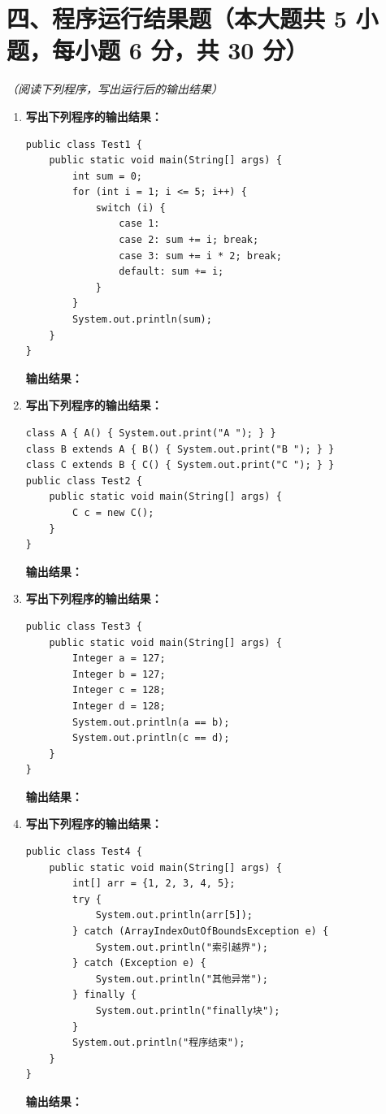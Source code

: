\documentclass[a3paper, landscape, 11pt, twocolumn]{article}
\begin{document}
\section*{四、程序运行结果题（本大题共 5 小题，每小题 6 分，共 30 分）}
\textit{（阅读下列程序，写出运行后的输出结果）}

\begin{enumerate}[label=\arabic*., itemsep=1em]
	\item \textbf{写出下列程序的输出结果：}
	      \begin{lstlisting}[style=JavaExam]
public class Test1 {
    public static void main(String[] args) {
        int sum = 0;
        for (int i = 1; i <= 5; i++) {
            switch (i) {
                case 1:
                case 2: sum += i; break;
                case 3: sum += i * 2; break;
                default: sum += i;
            }
        }
        System.out.println(sum);
    }
}
\end{lstlisting}
	      \textbf{输出结果：}\underline{\hspace{8cm}}

	\item \textbf{写出下列程序的输出结果：}
	      \begin{lstlisting}[style=JavaExam]
class A { A() { System.out.print("A "); } }
class B extends A { B() { System.out.print("B "); } }
class C extends B { C() { System.out.print("C "); } }
public class Test2 {
    public static void main(String[] args) {
        C c = new C();
    }
}
\end{lstlisting}
	      \textbf{输出结果：}\underline{\hspace{8cm}}

	\item \textbf{写出下列程序的输出结果：}
	      \begin{lstlisting}[style=JavaExam]
public class Test3 {
    public static void main(String[] args) {
        Integer a = 127;
        Integer b = 127;
        Integer c = 128;
        Integer d = 128;
        System.out.println(a == b);
        System.out.println(c == d);
    }
}
\end{lstlisting}
	      \textbf{输出结果：}\underline{\hspace{8cm}}

	\item \textbf{写出下列程序的输出结果：}
	      \begin{lstlisting}[style=JavaExam]
public class Test4 {
    public static void main(String[] args) {
        int[] arr = {1, 2, 3, 4, 5};
        try {
            System.out.println(arr[5]);
        } catch (ArrayIndexOutOfBoundsException e) {
            System.out.println("索引越界");
        } catch (Exception e) {
            System.out.println("其他异常");
        } finally {
            System.out.println("finally块");
        }
        System.out.println("程序结束");
    }
}
\end{lstlisting}
	      \textbf{输出结果：}\underline{\hspace{8cm}}


\end{enumerate}
\end{document}
